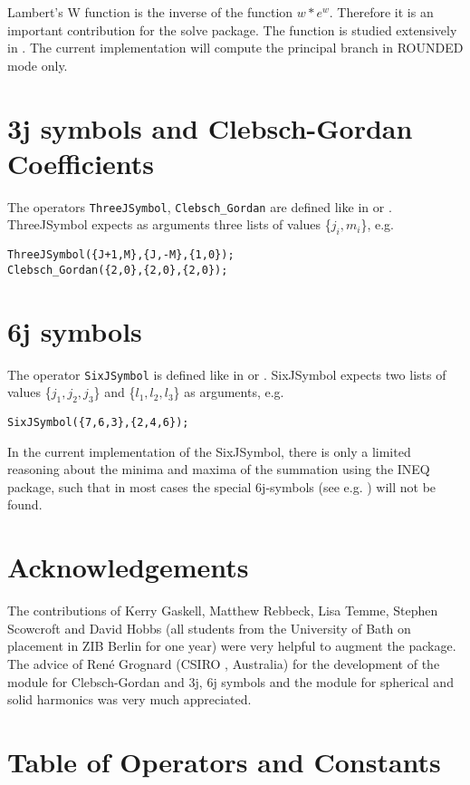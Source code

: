\documentclass[11pt]{article}
\begin{document}
Lambert's W function is the inverse of the function  $w*e^w$.
Therefore it is an important contribution for the solve package.
The function is studied extensively in \cite{Corless:92}.  
The current implementation will compute the principal branch in
ROUNDED mode only.

\section{3j symbols and Clebsch-Gordan Coefficients}
The operators {\tt ThreeJSymbol}, {\tt Clebsch\_Gordan} are defined like 
in \cite{Landolt:68} or \cite{Edmonds:57}. ThreeJSymbol expects as arguments
three lists of values \{$j_i,m_i$\}, e.g.

\begin{verbatim}
ThreeJSymbol({J+1,M},{J,-M},{1,0});
Clebsch_Gordan({2,0},{2,0},{2,0});
\end{verbatim}

\section{6j symbols }
The operator {\tt SixJSymbol} is defined like
in \cite{Landolt:68} or \cite{Edmonds:57}.
SixJSymbol expects two lists of values \{$j_1,j_2,j_3$\} and
 \{$l_1,l_2,l_3$\} as arguments, e.g.

\begin{verbatim}
SixJSymbol({7,6,3},{2,4,6});
\end{verbatim}

In the current implementation of the SixJSymbol, there is only a limited
reasoning about the minima and maxima of the summation using
the INEQ package, such that in most
cases the special 6j-symbols (see e.g. \cite{Landolt:68})
will not be found.



\section{Acknowledgements}

The contributions of Kerry Gaskell, Matthew Rebbeck, Lisa Temme,
Stephen Scowcroft and David Hobbs (all students from the University of Bath
on placement in ZIB Berlin for one year) were very helpful
to augment the package. The advice of Ren\'e Grognard (CSIRO , Australia)
for the development of the module for Clebsch-Gordan and 3j, 6j symbols
and the module for spherical and solid harmonics was very much appreciated.

\section{Table of Operators and Constants}
\end{document}
